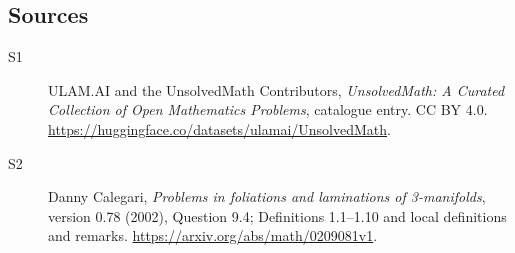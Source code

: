 \documentclass[11pt]{article}
\begin{document}
\subsection{Sources}
\begin{description}
\item[\hypertarget{source:statement:1}{S1}] ULAM.AI and the UnsolvedMath Contributors, \emph{UnsolvedMath: A Curated Collection of Open Mathematics Problems}, catalogue entry. CC BY 4.0. \url{https://huggingface.co/datasets/ulamai/UnsolvedMath}.
\item[\hypertarget{source:statement:2}{S2}] Danny Calegari, \emph{Problems in foliations and laminations of 3-manifolds}, version 0.78 (2002), Question 9.4; Definitions 1.1--1.10 and local definitions and remarks. \url{https://arxiv.org/abs/math/0209081v1}.
\end{description}
\label{end:statement}
\end{document}
